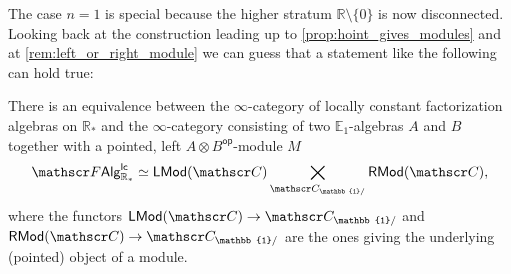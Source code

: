 \documentclass[../text]{subfiles}
\begin{document}





\begin{remark}
    The case $n=1$ is special because the higher stratum $\mathbb{R} \setminus \{0\}$ is now disconnected. Looking back at the construction leading up to \cref{prop:hoint_gives_modules} and at \cref{rem:left_or_right_module} we can guess that a statement like the following can hold true:
\end{remark}

\begin{proposition}
    There is an equivalence between the $\infty$-category of locally constant factorization algebras on $\mathbb{R}_*$ and the $\infty$-category consisting of two $\mathbb{E}_1$-algebras $A$ and $B$ together with a pointed, left $A \otimes B^\mathsf{op}$-module $M$
    \begin{equation}
        \lcfa_{\mathbb{R}_*} \simeq \mathsf{LMod} (\catC) \bigtimes_{\catC_{\mathbb{1}/}} \mathsf{RMod} (\catC),
    \end{equation}
    where the functors $\mathsf{LMod}(\catC) \rightarrow \catC_{\mathbb{1}/}$ and $\mathsf{RMod}(\catC) \rightarrow \catC_{\mathbb{1}/}$ are the ones giving the underlying (pointed) object of a module.
\end{proposition}
\end{document}
